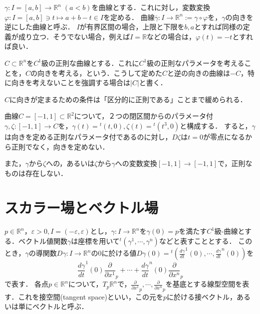 \documentclass[uplatex, 12pt, dvipdfmx]{jsarticle}
\begin{document}
\begin{definition}[逆向きの曲線]
    $\gamma:I=[a,b]\to\mathbb{R}^n\;(a<b)$を曲線とする．これに対し，変数変換$\varphi:I=[a,b]\ni t\mapsto a+b-t\in I$を定める．
    曲線$\overline{\gamma}:I\to\mathbb{R}^n :=\gamma\circ\varphi$を，$\gamma$の向きを逆にした曲線と呼ぶ．
    $I$が有界区間の場合，上限と下限を$b,a$とすれば同様の定義が成り立つ．そうでない場合，例えば$I=\mathbb{R}$などの場合は，$\varphi(t)=-t$とすれば良い．
\end{definition}
\begin{notation}
    $C\subset\mathbb{R}^n$を$C^1$級の正則な曲線とする．これに$C^1$級の正則なパラメータを考えることを，$C$の向きを考える，という．こうして定めた$C$と逆の向きの曲線は$-C$，特に向きを考えないことを強調する場合は$|C|$と書く．

    $C$に向きが定まるための条件は「区分的に正則である」ことまで緩められる．
\end{notation}

\begin{example}[スカラー場の変数変換]
    曲線$C=[-1,1]\subset\mathbb{R}^2$について，２つの閉区間からのパラメータ付$\gamma,\zeta:[-1,1]\to C$を，$\gamma(t)={}^t\!(t,0), \zeta(t)={}^t\!(t^3,0)$と構成する．
    すると，$\gamma$は向きを定める正則なパラメータ付であるのに対し，$D\zeta$は$t=0$が零点になるから正則でなく，向きを定めない．

    また，$\gamma$から$\zeta$への，あるいは$\zeta$から$\gamma$への変数変換$[-1,1]\to [-1,1]$で，正則なものは存在しない．
\end{example}

\section{スカラー場とベクトル場}
\begin{definition}[接空間]\rm{}
    $p\in\mathbb{R}^n$，$\varepsilon>0, I=(-\varepsilon,\varepsilon)$とし，$\gamma:I\to\mathbb{R}^n$を$\gamma(0)=p$を満たす$C^1$級-曲線とする．ベクトル値関数$\gamma$は座標を用いて${}^t\! (\gamma^1,\cdots,\gamma^n)$などと表すこととする．
    このとき，$\gamma$の導関数$D\gamma :I\to\mathbb{R}^n$の$0$に於ける値$D\gamma(0)={}^t\!\left( \frac{d\gamma}{dt}^1(0),\cdots,\frac{d\gamma}{dt}^n(0) \right)$を
    \[ \frac{d\gamma}{dt}^1(0)\frac{\partial}{\partial x^1}_p + \cdots + \frac{d\gamma}{dt}^n(0)\frac{\partial}{\partial x^n}_p \]
    で表す．
    各点$p\in\mathbb{R}^n$について，$T_p\mathbb{R}^n$で，$\frac{\partial}{\partial x^1}_p,\cdots,\frac{\partial}{\partial x^n}_p$を基底とする線型空間を表す．これを接空間(tangent space)といい，この元を$p$に於ける接ベクトル，あるいは単にベクトルと呼ぶ．
\end{definition}
\end{document}
